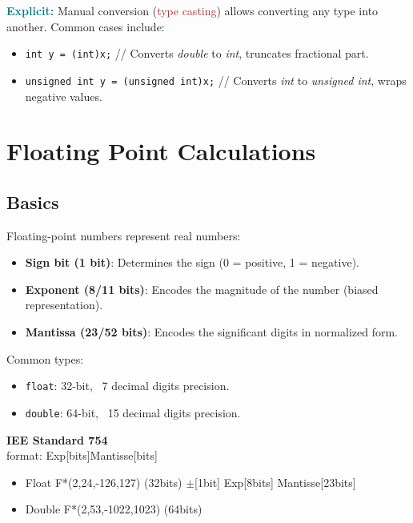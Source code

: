 \textbf{\textcolor{teal}{Explicit:}} Manual conversion (\textcolor{brown}{type casting}) allows converting any type into another. Common cases include:
\begin{itemize}
    \item \lstinline[style=CodeExpert]{int y = (int)x;} // Converts \textit{double} to \textit{int}, truncates fractional part.
    \item \lstinline[style=CodeExpert]{unsigned int y = (unsigned int)x;} // Converts \textit{int} to \textit{unsigned int}, wraps negative values.
\end{itemize}




\section{Floating Point Calculations}

\subsection{Basics}

Floating-point numbers represent real numbers:
\begin{itemize}
    \item \textbf{Sign bit (1 bit)}: Determines the sign (0 = positive, 1 = negative).
    \item \textbf{Exponent (8/11 bits)}: Encodes the magnitude of the number (biased representation).
    \item \textbf{Mantissa (23/52 bits)}: Encodes the significant digits in normalized form.
\end{itemize}

Common types:
\begin{itemize}
    \item \texttt{float}: 32-bit, ~7 decimal digits precision.
    \item \texttt{double}: 64-bit, ~15 decimal digits precision.
\end{itemize}

\textbf{IEE Standard 754}\\
format: Exp[bits]Mantisse[bits]
\begin{itemize}
    \item Float
    \subitem F*(2,24,-126,127) (32bits)
    \subitem $\pm$[1bit] Exp[8bits] Mantisse[23bits]
    \item Double 
    \subitem F*(2,53,-1022,1023) (64bits)
\end{itemize}

